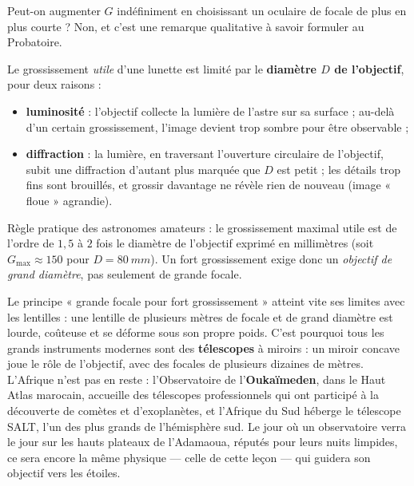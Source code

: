 \documentclass[11pt]{article}
\newcounter{popsec}
\newcounter{popsub}
\newcommand{\courssub}[1]{%
  \stepcounter{popsub}%
  \par\vspace{9pt}\noindent{\popxbold\fontsize{11.5}{13}\selectfont\color{popink}{\color{poporange}\thepopsec.\thepopsub}\hspace{6pt}#1}\par\nopagebreak\vspace{4pt}
}
\begin{document}
\courssub{Limite pratique du grossissement}

Peut-on augmenter $G$ indéfiniment en choisissant un oculaire de focale de plus en plus courte ? Non, et c'est une remarque qualitative à savoir formuler au Probatoire.

\begin{aretenir}
Le grossissement \emph{utile} d'une lunette est limité par le \textbf{diamètre $D$ de l'objectif}, pour deux raisons :
\begin{itemize}
\item \textbf{luminosité} : l'objectif collecte la lumière de l'astre sur sa surface ; au-delà d'un certain grossissement, l'image devient trop sombre pour être observable ;
\item \textbf{diffraction} : la lumière, en traversant l'ouverture circulaire de l'objectif, subit une diffraction d'autant plus marquée que $D$ est petit ; les détails trop fins sont brouillés, et grossir davantage ne révèle rien de nouveau (image « floue » agrandie).
\end{itemize}
Règle pratique des astronomes amateurs : le grossissement maximal utile est de l'ordre de $1,5$ à $2$ fois le diamètre de l'objectif exprimé en millimètres (soit $G_{\max} \approx 150$ pour $D = \SI{80}{mm}$). Un fort grossissement exige donc un \emph{objectif de grand diamètre}, pas seulement de grande focale.
\end{aretenir}

\begin{savaistu}
Le principe « grande focale pour fort grossissement » atteint vite ses limites avec les lentilles : une lentille de plusieurs mètres de focale et de grand diamètre est lourde, coûteuse et se déforme sous son propre poids. C'est pourquoi tous les grands instruments modernes sont des \textbf{télescopes} à miroirs : un miroir concave joue le rôle de l'objectif, avec des focales de plusieurs dizaines de mètres. L'Afrique n'est pas en reste : l'Observatoire de l'\textbf{Oukaïmeden}, dans le Haut Atlas marocain, accueille des télescopes professionnels qui ont participé à la découverte de comètes et d'exoplanètes, et l'Afrique du Sud héberge le télescope SALT, l'un des plus grands de l'hémisphère sud. Le jour où un observatoire verra le jour sur les hauts plateaux de l'Adamaoua, réputés pour leurs nuits limpides, ce sera encore la même physique — celle de cette leçon — qui guidera son objectif vers les étoiles.
\end{savaistu}
\end{document}

